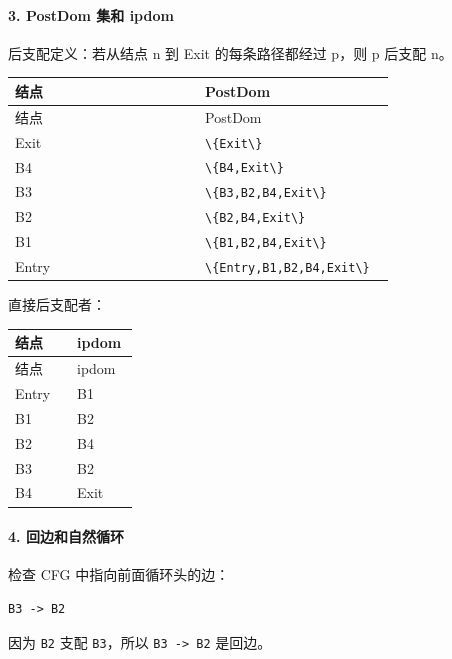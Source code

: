 \documentclass[UTF8]{ctexart}
\begin{document}
\paragraph*{3. PostDom 集和 ipdom}

后支配定义：若从结点 n 到 Exit 的每条路径都经过 p，则 p 后支配 n。

\begin{longtable}{|p{0.47\linewidth}|p{0.47\linewidth}|}
\hline
结点 & PostDom \\
\hline
\endfirsthead
结点 & PostDom \\
\hline
\endhead
Exit & \texttt{\textbackslash{}\{Exit\textbackslash{}\}} \\
\hline
B4 & \texttt{\textbackslash{}\{B4,Exit\textbackslash{}\}} \\
\hline
B3 & \texttt{\textbackslash{}\{B3,B2,B4,Exit\textbackslash{}\}} \\
\hline
B2 & \texttt{\textbackslash{}\{B2,B4,Exit\textbackslash{}\}} \\
\hline
B1 & \texttt{\textbackslash{}\{B1,B2,B4,Exit\textbackslash{}\}} \\
\hline
Entry & \texttt{\textbackslash{}\{Entry,B1,B2,B4,Exit\textbackslash{}\}} \\
\hline
\end{longtable}

直接后支配者：

\begin{longtable}{|p{0.47\linewidth}|p{0.47\linewidth}|}
\hline
结点 & ipdom \\
\hline
\endfirsthead
结点 & ipdom \\
\hline
\endhead
Entry & B1 \\
\hline
B1 & B2 \\
\hline
B2 & B4 \\
\hline
B3 & B2 \\
\hline
B4 & Exit \\
\hline
\end{longtable}

\paragraph*{4. 回边和自然循环}

检查 CFG 中指向前面循环头的边：

\begin{Verbatim}[fontsize=\small,breaklines=true]
B3 -> B2
\end{Verbatim}

因为 \texttt{B2} 支配 \texttt{B3}，所以 \texttt{B3 -> B2} 是回边。
\end{document}
